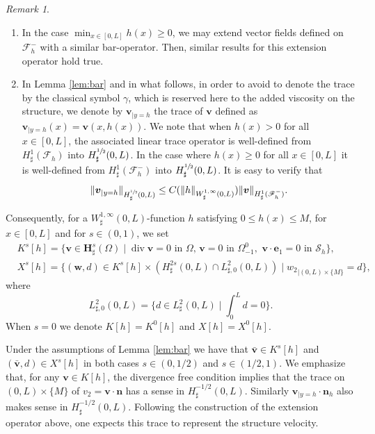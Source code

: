 \documentclass[11pt]{article}
\newcommand{\skpt}{\smallskip}
\let\mathcal\mathscr
\newenvironment{enumeratei}
{\bgroup\def\theenumi{\roman{enumi}}\def\theenumii{\arabic{enumii}}\begin{enumerate}}
{\end{enumerate}\egroup}
\theoremstyle{remark}
\newtheorem{remark}[theorem]{Remark}
\theoremstyle{definition}
\newcommand{\vg}{\boldsymbol{v}}
\DeclareMathOperator{\DIV}{div}
\newcommand{\wg}{\boldsymbol{w}}
\newcommand{\BS}[1]{\boldsymbol{#1}}
\let\CM\Omega
\begin{document}
\skpt
\begin{remark}
\label{rem:domaine}
\begin{enumeratei}
\item In the case $\min_{x\in [0, L]} h(x)\geq 0$, we may extend vector fields defined on $\mathcal{F}^-_h$ with a similar bar-operator. Then, similar results for this extension operator hold true.

\item In Lemma \ref{lem:bar} and in what follows, in order to avoid to denote the trace by the classical symbol $\gamma$, which is reserved here to the added viscosity on the structure, we denote by ${\boldsymbol v}_{|{y=h}}$ the trace of $\vg$ defined as ${\boldsymbol v}_{|{y=h}}(x)=\vg(x, h(x))$. We note that when $h(x)>0$ for all $x\in [0, L]$, the associated linear trace operator is well-defined from $H_\sharp^1(\mathcal{F}_h)$ into $H_\sharp^{\sfrac{1}{2}}(0, L)$. In the case where $h(x)\geq0$ for all $x\in [0, L]$ it is well-defined from $H_\sharp^1(\mathcal{F}^-_h)$ into $H_\sharp^{\sfrac{1}{2}}(0, L)$. It is easy to verify that
\begin{equation}
\label{est:trace}
\|\vg_{|{y=h}}\|_{H^{\sfrac{1}{2}}_\sharp(0, L)}\leq C(\|h\|_{W_\sharp^{1, \infty}(0, L)}) \|\vg\|_{H^1_\sharp(\mathcal{F}^-_h)}.
\end{equation}
\end{enumeratei}

\end{remark}
Consequently, for a $W^{1, \infty}_{\sharp}(0,L)$-function $h$ satisfying $0 \leq h(x) \leq M$, for $x\in [0, L]$ and for $s \in (0,1)$, we set
\begin{align}
&K^{s}[h]=\{\vg\in \BS{H}^{s}_{\sharp}(\CM)\mid \DIV{\vg}=0\text{ in }\CM,\,\vg=0\text{ in }\Omega_{-1}^{0},\,\,\vg\cdot\BS{e}_{1}=0\text{ in }\mathcal{S}_{h}\},\label{espace.Ks}\\
&X^{s}[h]=\{(\wg,d)\in K^{s}[h]\times (H^{2s}_{\sharp}(0,L)\cap L_{\sharp, 0}^{2}(0,L))\mid {w_{2}}_{|{(0, L)\times \{M\}}}=d\},\label{espace.Xs}
\end{align}
where
\[\textstyle
L_{\sharp, 0}^{2}(0,L)= \bigl\{d\in L_{\sharp}^{2}(0,L) \mid \int_0^L d =0\bigl\}.
\]
When $s=0$ we denote $K[h] = K^0[h]$ and $X[h] = X^0[h]$.

Under the assumptions of Lemma \ref{lem:bar}
we have that $\bar{\vg} \in K^s[h]$ and $(\bar{\vg},d) \in X^s[h]$ in both cases $s \in (0,1/2)$ and $s \in (1/2,1)$.
We emphasize that, for any $\vg\in K[h]$, the divergence free condition implies that the trace on ${(0, L)\times \{M\}}$ of ${v_{2}}=\vg\cdot\BS{n}$ has a sense in $H^{-1/2}_\sharp(0, L)$. Similarly $\vg_{|{y=h}}\cdot \BS{n}_h$ also makes sense in $H^{-1/2}_\sharp(0, L)$. Following the construction of the extension operator above, one expects this trace to represent the structure velocity.
\end{document}
